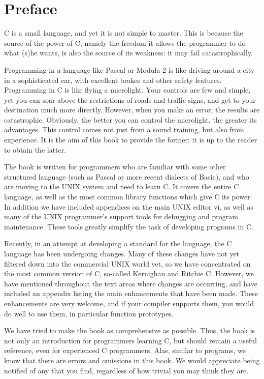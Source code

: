 \chapter*{Preface}

C is a small language, and yet it is not simple to master. This is
because the source of the power of C, namely
the freedom it allows the programmer to do what (s)he wants,
is also the source of its weakness: it may fail catastrophically.

Programming in a language like Pascal or Modula-2 is like driving
around a city in a sophisticated car, with excellent brakes and other
safety features.  Programming in C is like flying a microlight. Your
controls are few and simple, yet you can soar above the restrictions
of roads and traffic signs, and get to your destination much more
directly.  However, when you make an error, the results are
catastrophic. Obviously, the better you can control the microlight,
the greater its advantages.  This control comes not just from a sound
training, but also from experience.  It is the aim of this book to
provide the former; it is up to the reader to obtain the latter.

The book is written for programmers who are familiar with some other
structured language (such as Pascal or more recent dialects of
Basic), and who are moving to the UNIX system and need to learn C.
It covers the entire C language, as well as the most common
library functions which give C its power.  In addition 
we have included appendices on the main UNIX editor {\cmd vi},
as well as many of the UNIX programmer's support tools for debugging
and program maintenance. These tools greatly simplify the task of
developing programs in C.

Recently, in an attempt at developing a standard for the language,
the C language has been undergoing changes.  Many of these changes
have not yet filtered down into the commercial UNIX world yet, so we
have concentrated on the most common version of C, so-called
Kernighan and Ritchie C. However, we have mentioned throughout the
text areas where changes are occurring, and  have included an
appendix listing the main enhancements that have been made. These
enhancements are very welcome, and if your compiler supports them,
you would do well to use them, in particular function
prototypes.

We have tried to make the book as comprehensive as possible. Thus,
the book is not only an introduction for programmers learning C, but
should remain a useful reference, even for experienced C programmers.
Alas, similar to programs, we know that there are errors and omissions
in this book.  We would appreciate being notified of any that you
find, regardless of how trivial you may think they are.

